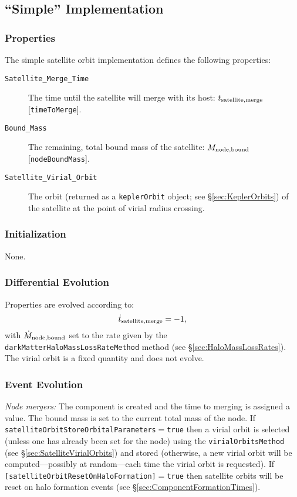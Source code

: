 \subsection{``Simple'' Implementation}\label{sec:SatelliteOrbitComponentSimple}

\subsubsection{Properties}

The simple satellite orbit implementation defines the following properties:
\begin{description}
 \item [{\tt Satellite\_Merge\_Time}] The time until the satellite will merge with its host: $t_{\rm satellite, merge}$ [{\tt timeToMerge}].
 \item [{\tt Bound\_Mass}] The remaining, total bound mass of the satellite: $M_{\rm node,bound}$ [{\tt nodeBoundMass}].
 \item[{\tt Satellite\_Virial\_Orbit}] The orbit (returned as a {\tt keplerOrbit} object; see \S\ref{sec:KeplerOrbits}) of the satellite at the point of virial radius crossing.
\end{description}

\subsubsection{Initialization}

None.

\subsubsection{Differential Evolution}

Properties are evolved according to:
\begin{equation}
 \dot{t}_{\rm satellite, merge} = -1,
\end{equation}
with $\dot{M}_{\rm node,bound}$ set to the rate given by the {\tt darkMatterHaloMassLossRateMethod} method (see \S\ref{sec:HaloMassLossRates}). The virial orbit is a fixed quantity and does not evolve.

\subsubsection{Event Evolution}

\noindent\emph{Node mergers:} The \gls{component} is created and the time to merging is assigned a value. The bound mass is set to the current total mass of the node. If {\tt satelliteOrbitStoreOrbitalParameters}$=${\tt true} then a virial orbit is selected (unless one has already been set for the node) using the {\tt virialOrbitsMethod} (see \S\ref{sec:SatelliteVirialOrbits}) and stored (otherwise, a new virial orbit will be computed---possibly at random---each time the virial orbit is requested). If {\tt [satelliteOrbitResetOnHaloFormation]}$=${\tt true} then satellite orbits will be reset on halo formation events (see \S\ref{sec:ComponentFormationTimes}).\\

